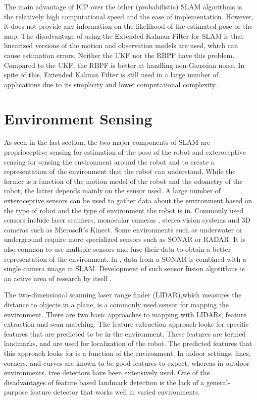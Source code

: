 	The main advantage of ICP over the other (probabilistic) SLAM algorithms is the relatively high computational speed and the ease of implementation. However, it does not provide any information on the likelihood of the estimated pose or the map. The disadvantage of using the Extended Kalman Filter for SLAM is that linearized versions of the motion and observation models are used, which can cause estimation errors. Neither the UKF nor the RBPF have this problem. Compared to the UKF, the RBPF is better at handling non-Gaussian noise. In spite of this, Extended Kalman Filter is still used in a large number of applications due to its simplicity and lower computational complexity.

	\section{Environment Sensing}	
	
	As seen in the last section, the two major components of SLAM are proprioceptive sensing for estimation of the pose of the robot and exteroceptive sensing for sensing the environment around the robot and to create a representation of the environment that the robot can understand. While the former is a function of the motion model of the robot and the odometry of the robot, the latter depends mainly on the sensor used. A large number of exteroceptive sensors can be used to gather data about the environment based on the type of robot and the type of environment the robot is in. Commonly used sensors include laser scanners\cite{lidar1, lidar2, lidar3, lidar4, lidar5}, monocular cameras \cite{mono1, mono2, mono3, mono4, mono5, mono6, mono7}, stereo vision systems \cite{stereo1, stereo2, stereo3,stereo4, stereo5} and 3D cameras such as Microsoft's Kinect\cite{kinect1,kinect2,kinect3}. Some environments such as underwater or underground require more specialized sensors such as SONAR or RADAR\cite{radar, sonar1, sonar2, sonar3}. It is also common to use multiple sensors and fuse their data to obtain a better representation of the environment. In \cite{combo1}, data from a SONAR is combined with a single camera image in SLAM. Development of such sensor fusion algorithms is an active area of research by itself \cite{combo2,combo3,combo4}.
	
	The two-dimensional scanning laser range finder (LIDAR),which measures the distance to objects in a plane, is a commonly used sensor for mapping the environment. There are two basic approaches to mapping with LIDARs, feature extraction and scan matching. The feature extraction approach looks for specific features that are predicted to be in the environment. These features are termed landmarks, and are used for localization of the robot. The predicted features that this approach looks for is a function of the environment. In indoor settings, lines, corners, and curves are known to be good features to expect\cite{indoor1, indoor2, indoor3, indoor4}, whereas in outdoor environments, tree detectors\cite{trees} have been extensively used\cite{outdoor1, outdoor2, outdoor3}. One of the disadvantages of feature based landmark detection is the lack of a general-purpose feature detector that works well in varied environments. 
	

